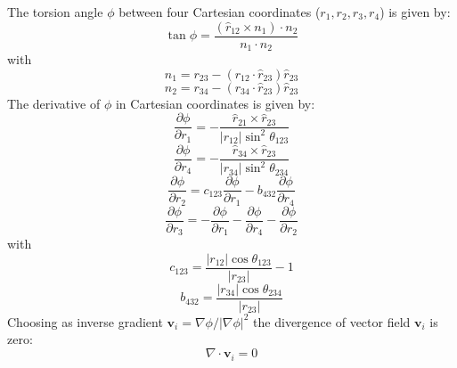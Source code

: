 The torsion angle $\phi$ between four Cartesian coordinates ($r_1, r_2, r_3, r_4$) is given by:
\begin{equation}
  \tan \phi = \frac{(\hat{r}_{12} \times n_1) \cdot n_2}{n_1 \cdot n_2}
\end{equation}
with
\begin{equation}
  n_1 = r_{23} - (r_{12} \cdot \hat{r}_{23})\hat{r}_{23}
\end{equation}
\begin{equation}
  n_2 = r_{34} - (r_{34} \cdot \hat{r}_{23})\hat{r}_{23}
\end{equation}
The derivative of $\phi$ in Cartesian coordinates is given by:
\begin{equation}
  \frac{\partial\phi}{\partial r_1} = - \frac{\hat{r}_{21}\times\hat{r}_{23}}{|r_{12}|\sin^2\theta_{123}}
\end{equation}
\begin{equation}
  \frac{\partial\phi}{\partial r_4} = - \frac{\hat{r}_{34}\times\hat{r}_{23}}{|r_{34}|\sin^2\theta_{234}}
\end{equation}
\begin{equation}
  \frac{\partial\phi}{\partial r_2} = c_{123}\frac{\partial\phi}{\partial r_1} - b_{432}\frac{\partial\phi}{\partial r_4}
\end{equation}
\begin{equation}
  \frac{\partial\phi}{\partial r_3} = - \frac{\partial\phi}{\partial r_1} - \frac{\partial\phi}{\partial r_4} - \frac{\partial\phi}{\partial r_2}
\end{equation}
with
\begin{equation}
  c_{123} = \frac{|r_{12}|\cos\theta_{123}}{|r_{23}|}-1
\end{equation}
\begin{equation}
  b_{432} = \frac{|r_{34}|\cos\theta_{234}}{|r_{23}|}
\end{equation}
Choosing as inverse gradient $\textbf{v}_i = \nabla \phi/|\nabla \phi|^2$ the divergence of vector field $\textbf{v}_i$ is zero:
\begin{equation}
  \nabla \cdot \textbf{v}_i = 0
\end{equation}
